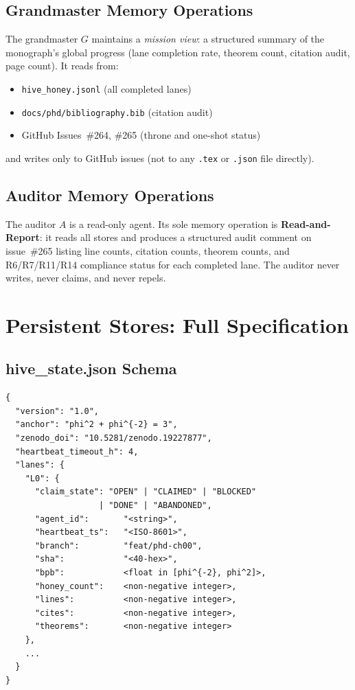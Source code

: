 \subsection{Grandmaster Memory Operations}
\label{ssec:K-gm-ops}

The grandmaster $G$ maintains a \emph{mission view}: a structured
summary of the monograph's global progress (lane completion rate,
theorem count, citation audit, page count). It reads from:
\begin{itemize}
  \item \texttt{hive\_honey.jsonl} (all completed lanes)
  \item \texttt{docs/phd/bibliography.bib} (citation audit)
  \item GitHub Issues~\#264, \#265 (throne and one-shot status)
\end{itemize}
and writes only to GitHub issues (not to any \texttt{.tex} or
\texttt{.json} file directly).

\subsection{Auditor Memory Operations}
\label{ssec:K-auditor-ops}

The auditor $A$ is a read-only agent. Its sole memory operation is
\textbf{Read-and-Report}: it reads all stores and produces a structured
audit comment on issue~\#265 listing line counts, citation counts,
theorem counts, and R6/R7/R11/R14 compliance status for each completed
lane. The auditor never writes, never claims, and never repels.


\section{Persistent Stores: Full Specification}
\label{sec:K-stores-full}

\subsection{hive\_state.json Schema}
\label{ssec:K-hive-state-schema}

\begin{verbatim}
{
  "version": "1.0",
  "anchor": "phi^2 + phi^{-2} = 3",
  "zenodo_doi": "10.5281/zenodo.19227877",
  "heartbeat_timeout_h": 4,
  "lanes": {
    "L0": {
      "claim_state": "OPEN" | "CLAIMED" | "BLOCKED"
                   | "DONE" | "ABANDONED",
      "agent_id":       "<string>",
      "heartbeat_ts":   "<ISO-8601>",
      "branch":         "feat/phd-ch00",
      "sha":            "<40-hex>",
      "bpb":            <float in [phi^{-2}, phi^2]>,
      "honey_count":    <non-negative integer>,
      "lines":          <non-negative integer>,
      "cites":          <non-negative integer>,
      "theorems":       <non-negative integer>
    },
    ...
  }
}
\end{verbatim}

